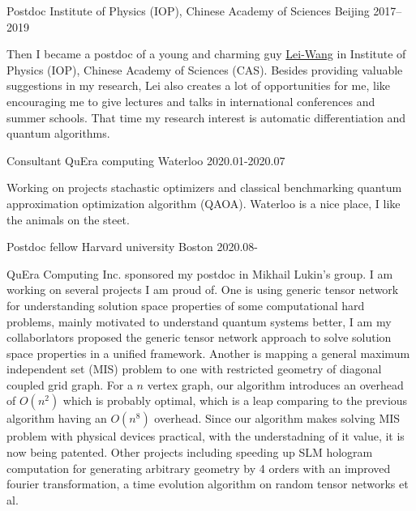 \documentclass[11pt, a4paper]{awesome-cv}
\begin{document}
\begin{cvskills}
\end{cvskills}
\begin{cventries}
  \cventry
    {Postdoc}
    {Institute of Physics (IOP), Chinese Academy of Sciences}
    {Beijing}
    {2017--2019}
    {\begin{cvitems}
        Then I became a postdoc of a young and charming guy \href{http://wangleiphy.github.io/}{Lei-Wang} in Institute of Physics (IOP), Chinese Academy of Sciences (CAS). Besides providing valuable suggestions in my research, Lei also creates a lot of opportunities for me, like encouraging me to give lectures and talks in international conferences and summer schools.
That time my research interest is automatic differentiation and quantum algorithms.
    \end{cvitems}}
  \cventry
    {Consultant}
    {QuEra computing}
    {Waterloo}
    {2020.01-2020.07}  %
    {\begin{cvitems}
        Working on projects stachastic optimizers and classical benchmarking quantum approximation optimization algorithm (QAOA). Waterloo is a nice place, I like the animals on the steet.
    \end{cvitems}}

  \cventry
    {Postdoc fellow}
    {Harvard university}
    {Boston}
    {2020.08-}  %
    {\begin{cvitems}
    QuEra Computing Inc. sponsored my postdoc in Mikhail Lukin's group. I am working on several projects I am proud of.
    One is using generic tensor network for understanding solution space properties of some computational hard problems, mainly motivated to understand quantum systems better, I am my collaborlators proposed the generic tensor network approach to solve solution space properties in a unified framework.
        Another is mapping a general maximum independent set (MIS) problem to one with restricted geometry of diagonal coupled grid graph.
    For a $n$ vertex graph, our algorithm introduces an overhead of $O(n^2)$ which is probably optimal, which is a leap comparing to the previous algorithm having an $O(n^8)$ overhead. Since our algorithm makes solving MIS problem with physical devices practical, with the understadning of it value, it is now being patented.
    Other projects including speeding up SLM hologram computation for generating arbitrary geometry by 4 orders with an improved fourier transformation, a time evolution algorithm on random tensor networks et al.
    \end{cvitems}}
\end{cventries}
\end{document}
